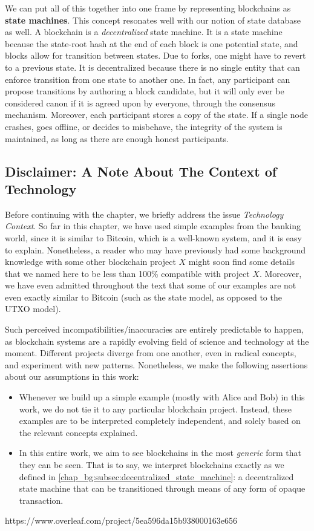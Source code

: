 We can put all of this together into one frame by representing blockchains as \textbf{state
machines}. This concept resonates well with our notion of state database as well. A blockchain is a
\textit{decentralized} state machine. It is a state machine because the state-root hash at the end
of each block is one potential state, and blocks allow for transition between states. Due to forks,
one might have to revert to a previous state. It is decentralized because there is no single entity
that can enforce transition from one state to another one. In fact, any participant can propose
transitions by authoring a block candidate, but it will only ever be considered canon if it is
agreed upon by everyone, through the consensus mechanism. Moreover, each participant stores a copy
of the state. If a single node crashes, goes offline, or decides to misbehave, the integrity of the
system is maintained, as long as there are enough honest participants.


\subsection{Disclaimer: A Note About The Context of Technology}

Before continuing with the chapter, we briefly address the issue \textit{Technology Context}. So far
in this chapter, we have used simple examples from the banking world, since it is similar to
Bitcoin, which is a well-known system, and it is easy to explain. Nonetheless, a reader who may have
previously had some background knowledge with some other blockchain project $X$ might soon find some
details that we named here to be less than 100\% compatible with project $X$. Moreover, we have even
admitted throughout the text that some of our examples are not even exactly similar to Bitcoin (such
as the state model, as opposed to the UTXO model).

Such perceived incompatibilities/inaccuracies are entirely predictable to happen, as blockchain
systems are a rapidly evolving field of science and technology at the moment. Different projects
diverge from one another, even in radical concepts, and experiment with new patterns. Nonetheless,
we make the following assertions about our assumptions in this work:

\begin{itemize}
	\item Whenever we build up a simple example (mostly with Alice and Bob) in this work, we do not
	tie it to any particular blockchain project. Instead, these examples are to be interpreted
	completely independent, and solely based on the relevant concepts explained.
	\item In this entire work, we aim to see blockchains in the most \textit{generic} form that they
	can be seen. That is to say, we interpret blockchains exactly as we defined in
	\ref{chap_bg:subsec:decentralized_state_machine}: a decentralized state machine that can be
	transitioned through means of any form of opaque transaction.
	\end{itemize}https://www.overleaf.com/project/5ea596da15b938000163e656

